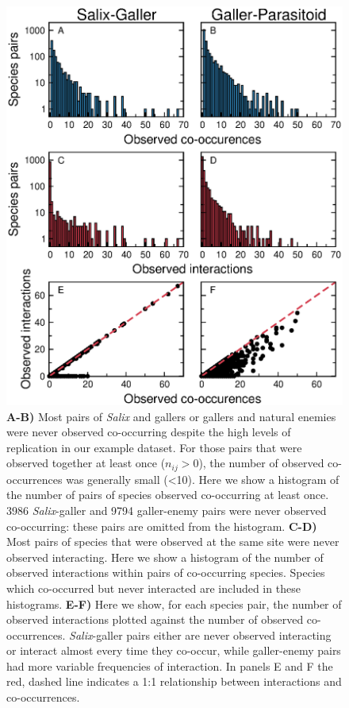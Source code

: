 \documentclass[12pt]{article}
\begin{document}
\clearpage


  \begin{figure}[h!]
      \caption{\textbf{A-B)} Most pairs of \emph{Salix} and gallers or gallers and natural enemies were never observed co-occurring despite the high levels of replication in our example dataset. For those pairs that were observed together at least once ($n_{ij}>0$), the number of observed co-occurrences was generally small (\textless10). Here we show a histogram of the number of pairs of species observed co-occurring at least once. 3986 \emph{Salix}-galler and 9794 galler-enemy pairs were never observed co-occurring: these pairs are omitted from the histogram. \textbf{C-D)} Most pairs of species that were observed at the same site were never observed interacting. Here we show a histogram of the number of observed interactions within pairs of co-occurring species. Species which co-occurred but never interacted are included in these histograms. \textbf{E-F)} Here we show, for each species pair, the number of observed interactions plotted against the number of observed co-occurrences. \emph{Salix}-galler pairs either are never observed interacting or interact almost every time they co-occur, while galler-enemy pairs had more variable frequencies of interaction. In panels E and F the red, dashed line indicates a 1:1 relationship between interactions and co-occurrences.}
      \label{histograms}
      \begin{center}
      \includegraphics*[width=.8\textwidth]{figures/Salix_Galler_histogram.eps}
      \end{center}
      \end{figure}
\end{document}
